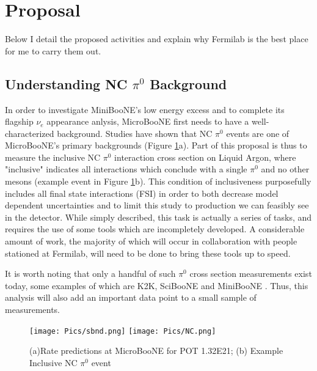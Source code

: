 \documentclass[12pt]{article}
\begin{document}




\section{Proposal}
Below I detail the proposed activities and explain why Fermilab is the best place for me to carry them out. 
\subsection{Understanding NC $\pi^0$ Background}

In order to investigate MiniBooNE's low energy excess and to complete its flagship $\nu_e$ appearance anlysis, MicroBooNE first needs to have a well-characterized background. Studies have shown \cite{sbnd} that NC $\pi^0$ events are one of MicroBooNE's primary backgrounds (Figure \ref{fig:CCNC}a). Part of this proposal is thus to measure the inclusive NC $\pi^0$ interaction cross section on Liquid Argon, where "inclusive" indicates all interactions which conclude with a single $\pi^0$ and no other mesons (example event in Figure \ref{fig:CCNC}b). This condition of inclusiveness purposefully includes all final state interactions (FSI) in order to both decrease model dependent uncertainties and to limit this study to production we can feasibly see in the detector. While simply described, this task is actually a series of tasks, and requires the use of some tools which are incompletely developed. A considerable amount of work, the majority of which will occur in collaboration with people stationed at Fermilab, will need to be done to bring these tools up to speed.
\par \vspace{3 mm}It is worth noting that only a handful of such $\pi^0$ cross section measurements exist today, some examples of which are K2K, SciBooNE and MiniBooNE \cite{k2k}\cite{sciboone}\cite{anderson}. Thus, this analysis will also add an important data point to a small sample of measurements. 


\begin{figure}[h!]
\centering
\texttt{[image: Pics/sbnd.png]}
\hspace{.5 cm}
\texttt{[image: Pics/NC.png]}
\caption{(a)Rate predictions at MicroBooNE for POT 1.32E21; (b) Example Inclusive NC $\pi^0$ event  }
\label{fig:CCNC}
\end{figure}
\end{document}
